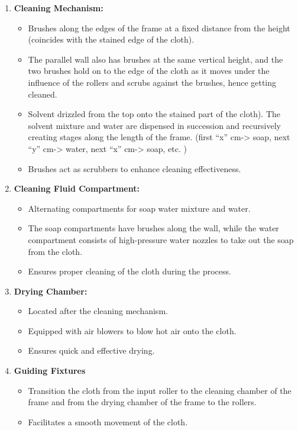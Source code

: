 \documentclass[table]{rapportCS}
\begin{document}
\begin{enumerate}[label=\arabic*.]
    \item \textbf{Cleaning Mechanism:}
    \begin{itemize}[label=$\bullet$]
        \item Brushes along the edges of the frame at a fixed distance from the height (coincides with the stained edge of the cloth).
        \item The parallel wall also has brushes at the same vertical height, and the two brushes hold on to the edge of the cloth as it moves under the influence of the rollers and scrubs against the brushes, hence getting cleaned.
        \item Solvent drizzled from the top onto the stained part of the cloth). The solvent mixture and water are dispensed in succession and recursively creating stages along the length of the frame. (first “x” cm-> soap, next “y” cm-> water, next “x” cm-> soap, etc. )
        \item Brushes act as scrubbers to enhance cleaning effectiveness.
    \end{itemize}

    \item \textbf{Cleaning Fluid Compartment:}
    \begin{itemize}[label=$\bullet$]
        \item Alternating compartments for soap water mixture and water.
        \item The soap compartments have brushes along the wall, while the water compartment consists of high-pressure water nozzles to take out the soap from the cloth.
        \item Ensures proper cleaning of the cloth during the process.
    \end{itemize}

    \item \textbf{Drying Chamber:}
    \begin{itemize}[label=$\bullet$]
        \item Located after the cleaning mechanism.
        \item Equipped with air blowers  to blow hot air onto the cloth.
        \item Ensures quick and effective drying.
    \end{itemize}

    \item \textbf{Guiding Fixtures }
    \begin{itemize}[label=$\bullet$]
        \item Transition the cloth from the input roller to the cleaning chamber of the frame and from the drying chamber of the frame to the rollers.
        \item Facilitates a smooth movement of the cloth.
    \end{itemize}


\end{enumerate}
\end{document}
